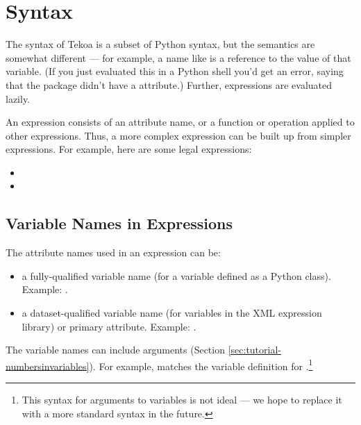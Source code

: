 \section{Syntax}

The syntax of Tekoa is a subset of Python syntax, but the semantics are
somewhat different --- for example, a name like
 is a reference to the value of that
variable.  (If you just evaluated this in a Python shell you'd get an
error, saying that the  package didn't have a
 attribute.)  Further, expressions are evaluated
lazily.

An expression consists of an attribute name, or a function or operation
applied to other expressions.  Thus, a more complex expression can be built
up from simpler expressions.  For example, here are some legal expressions:

\begin{itemize}

\item {}
\item {}

\end{itemize}

\subsection{Variable Names in Expressions}

The attribute names used in an expression can be:

\begin{itemize}
\item a fully-qualified variable name (for a variable defined as a Python
  class).  Example: .

\item a dataset-qualified variable name (for variables in the XML
  expression library) or primary attribute.  Example:
  .
\end{itemize}

The variable names can include arguments (Section
\ref{sec:tutorial-numbersinvariables}). For example, 
matches the variable definition for
.\footnote{This syntax for arguments
  to variables is not ideal --- we hope to replace it with a more standard
  syntax in the future.}

